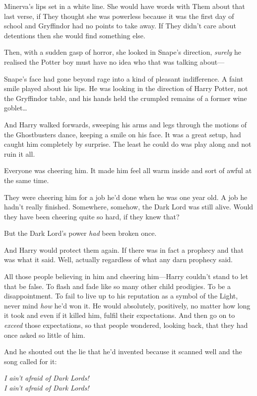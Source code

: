 Minerva's lips set in a white line. She would have words with Them about that
last verse, if They thought she was powerless because it was the first day of
school and Gryffindor had no points to take away. If They didn't care about
detentions then she would find something else.

Then, with a sudden gasp of horror, she looked in Snape's direction,
\emph{surely} he realised the Potter boy must have no idea who that was talking
about---

Snape's face had gone beyond rage into a kind of pleasant indifference. A faint
smile played about his lips. He was looking in the direction of Harry Potter,
not the Gryffindor table, and his hands held the crumpled remains of a former
wine goblet…

And Harry walked forwards, sweeping his arms and legs through the motions of
the Ghostbusters dance, keeping a smile on his face. It was a great setup, had
caught him completely by surprise. The least he could do was play along and not
ruin it all.

Everyone was cheering him. It made him feel all warm inside and sort of awful
at the same time.

They were cheering him for a job he'd done when he was one year old. A job he
hadn't really finished. Somewhere, somehow, the Dark Lord was still alive.
Would they have been cheering quite so hard, if they knew that?

But the Dark Lord's power \emph{had} been broken once.

And Harry would protect them again. If there was in fact a prophecy and that
was what it said. Well, actually regardless of what any darn prophecy said.

All those people believing in him and cheering him---Harry couldn't stand to
let that be false. To flash and fade like so many other child prodigies. To be
a disappointment. To fail to live up to his reputation as a symbol of the
Light, never mind \emph{how} he'd won it. He would absolutely, positively,
no matter how long it took and even if it killed him, fulfil their
expectations. And then go on to \emph{exceed} those expectations, so that
people wondered, looking back, that they had once asked so little of him.

And he shouted out the lie that he'd invented because it scanned well and the
song called for it:

\begin{center}
\emph{I ain't afraid of Dark Lords!\\
I ain't afraid of Dark Lords!}
\end{center}

